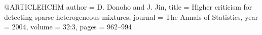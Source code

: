 @ARTICLE{HCHM
  author =       {D. Donoho and J. Jin},
  title =        {Higher criticism for detecting sparse
  heterogeneous mixtures},
  journal =      {The Annals of Statistics},
  year =         {2004},
  volume =       {32:3},
  pages =        {962--994}
}
